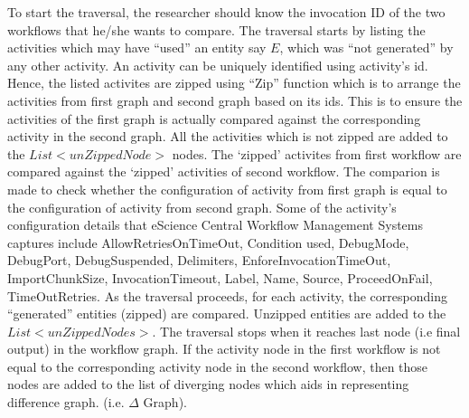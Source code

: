 \documentclass[10pt,conference,twocolumn]{IEEEtran}
\begin{document}
To start the traversal, the researcher should know the invocation ID of the two workflows that he/she wants to compare. The traversal starts by listing the activities which may have \enquote{used} an entity say $E$, which was \enquote{not generated} by any other activity. An activity can be uniquely identified using activity's id. Hence, the listed activites are zipped using \enquote{Zip} function which is to arrange the activities from first graph and second graph based on its ids.  This is to ensure the activities of the first graph is actually compared against the corresponding activity in the second graph. All the activities which is not zipped are added to the $List<unZippedNode>$ nodes. The `zipped' activites from first workflow are compared against the `zipped' activities of second workflow. The comparion is made to check whether the configuration of activity from first graph is equal to the configuration of activity from second graph. Some of the activity's configuration details that eScience Central Workflow Management Systems captures include AllowRetriesOnTimeOut, Condition used, DebugMode, DebugPort, DebugSuspended, Delimiters, EnforeInvocationTimeOut, ImportChunkSize, InvocationTimeout, Label, Name, Source, ProceedOnFail, TimeOutRetries. As the traversal proceeds, for each activity, the corresponding \enquote{generated} entities (zipped) are compared. Unzipped entities are added to the $List<unZippedNodes>$. The traversal stops when it reaches last node (i.e final output) in the workflow graph. If the activity node in the first workflow is not equal to the corresponding activity node in the second workflow, then those nodes are added to the list of diverging nodes which aids in representing difference graph. (i.e. $\Delta$ Graph).
\end{document}
